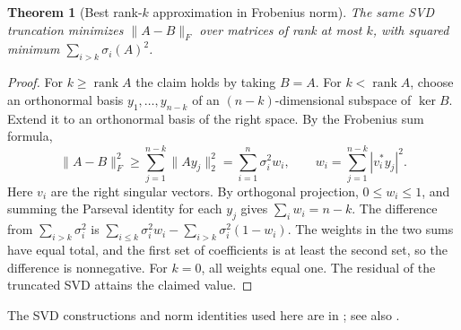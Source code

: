 \documentclass[11pt,oneside,openany]{book}
\theoremstyle{plain}
\newtheorem{theorem}{Theorem}[chapter]
\theoremstyle{definition}
\theoremstyle{remark}
\begin{document}
\begin{theorem}[Best rank-\(k\) approximation in Frobenius norm]
\label{p206:W42}
The same SVD truncation minimizes \(\|A-B\|_F\) over matrices
of rank at most \(k\), with squared minimum
\(\sum_{i>k}\sigma_i(A)^2\).
\end{theorem}
\begin{proof}
For \(k\ge\operatorname{rank} A\) the claim holds by taking \(B=A\).
For \(k<\operatorname{rank} A\), choose an orthonormal basis
\(y_1,\ldots,y_{n-k}\) of an \((n-k)\)-dimensional subspace of
\(\ker B\). Extend it to an orthonormal basis of the right space.
By the Frobenius sum formula,
\[
 \|A-B\|_F^2
    \ge\sum_{j=1}^{n-k}\|Ay_j\|_2^2
    =\sum_{i=1}^n\sigma_i^2 w_i,\qquad
       w_i=\sum_{j=1}^{n-k}|v_i^*y_j|^2 .
\]
Here \(v_i\) are the right singular vectors. By orthogonal
projection, \(0\le w_i\le1\), and summing the Parseval identity
for each \(y_j\) gives \(\sum_i w_i=n-k\).
The difference from \(\sum_{i>k}\sigma_i^2\) is
\(\sum_{i\le k}\sigma_i^2w_i-\sum_{i>k}\sigma_i^2(1-w_i)\).
The weights in the two sums have equal total, and the first
set of coefficients is at least the second set, so the difference
is nonnegative. For \(k=0\), all weights equal one.
The residual of the truncated SVD attains the claimed value.
\end{proof}
The SVD constructions and norm identities used here are in
\cite[Section 14]{d05}; see also \cite[Section 2.4]{golub}.
\end{document}

